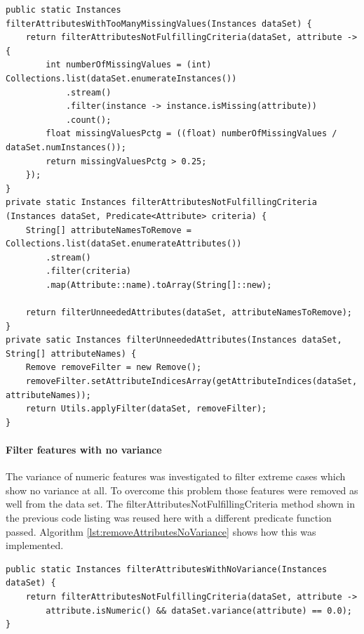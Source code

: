 \begin{lstlisting}[caption={Remove unneeded features}, label={lst:removeUnneededFeatures}]
public static Instances filterAttributesWithTooManyMissingValues(Instances dataSet) {
	return filterAttributesNotFulfillingCriteria(dataSet, attribute -> {
		int numberOfMissingValues = (int) Collections.list(dataSet.enumerateInstances())
			.stream()
			.filter(instance -> instance.isMissing(attribute))
			.count();
		float missingValuesPctg = ((float) numberOfMissingValues / dataSet.numInstances());
		return missingValuesPctg > 0.25;
	});
}
private static Instances filterAttributesNotFulfillingCriteria
(Instances dataSet, Predicate<Attribute> criteria) {
	String[] attributeNamesToRemove = Collections.list(dataSet.enumerateAttributes())
		.stream()
		.filter(criteria)
		.map(Attribute::name).toArray(String[]::new);
		
	return filterUnneededAttributes(dataSet, attributeNamesToRemove);
}
private satic Instances filterUnneededAttributes(Instances dataSet, String[] attributeNames) {
	Remove removeFilter = new Remove();
	removeFilter.setAttributeIndicesArray(getAttributeIndices(dataSet, attributeNames));
	return Utils.applyFilter(dataSet, removeFilter);
}
\end{lstlisting}

\paragraph{Filter features with no variance}
The variance of numeric features was investigated to filter extreme cases which show no variance at all. To overcome this problem those features were removed as well from the data set. The filterAttributesNotFulfillingCriteria method shown in the previous code listing was reused here with a different predicate function passed. Algorithm \ref{lst:removeAttributesNoVariance} shows how this was implemented.

\begin{lstlisting}[caption={Remove features}, label={lst:removeUnneededFeatures}]
public static Instances filterAttributesWithNoVariance(Instances dataSet) {
	return filterAttributesNotFulfillingCriteria(dataSet, attribute ->
		attribute.isNumeric() && dataSet.variance(attribute) == 0.0);
}
\end{lstlisting}

